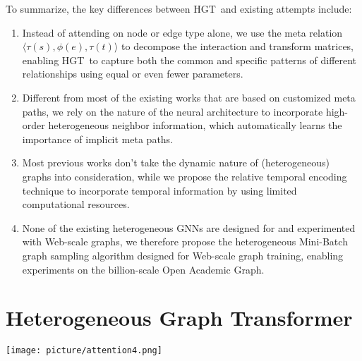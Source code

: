 \documentclass[sigconf]{acmart}
\theoremstyle{definition}
\newcommand{\short}{HGT}
\begin{document}
To summarize, the key differences between \short\ and existing attempts include:
\begin{enumerate}
    \item Instead of attending on node or edge type alone, we use the meta relation $\langle \tau(s), \phi(e), \tau(t) \rangle$ to decompose the interaction and transform matrices, enabling \short\ to capture both the common and specific patterns of different relationships using equal or even fewer parameters.
    \item Different from most of the existing works that are based on customized meta paths, we rely on the nature of the neural architecture to incorporate high-order heterogeneous neighbor information, which automatically learns the importance of implicit meta paths.  
    \item Most previous works don't take the dynamic nature of (heterogeneous) graphs into consideration, while we propose the relative temporal encoding technique to incorporate temporal information by using limited computational resources.
    \item None of the existing heterogeneous GNNs are designed for and experimented with Web-scale graphs, we therefore propose the heterogeneous Mini-Batch graph sampling algorithm designed for Web-scale graph training, enabling experiments on the billion-scale Open Academic Graph.
\end{enumerate} 

\section{Heterogeneous Graph Transformer}\label{sec:approach}
\begin{figure*}[ht!]
    \centering
    \texttt{[image: picture/attention4.png]}
    \caption{The Overall Architecture of Heterogeneous Graph Transformer. 
    \textmd{ Given a sampled heterogeneous sub-graph with $t$ as the target node, $s_1$ \& $s_2$ as source nodes, the \short\ model takes its edges $e_1=(s_1, t)$ \& $e_2=(s_2, t)$ and their corresponding meta relations $<\tau(s_1), \phi(e_1), \tau(t)>$ \& $<\tau(s_2), \phi(e_2), \tau(t)>$ as input to learn a  contextualized representation $H^{(L)}$ for each node, which can be used for downstream  tasks. 
    Color decodes the node type. 
    HGT includes three components: (1) meta relation-aware heterogeneous mutual attention,  (2) heterogeneous message passing from source nodes, and (3) target-specific heterogeneous message aggregation.}}
    \label{fig:my_label}
\end{figure*} 
\end{document}
